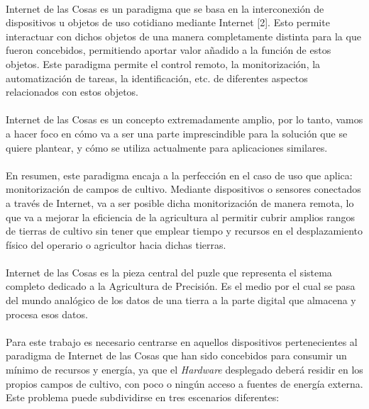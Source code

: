 \documentclass[../../memoria.tex]{subfiles}
\begin{document}
\paragraph{}
Internet de las Cosas es un paradigma que se basa en la interconexión de dispositivos u objetos de uso cotidiano mediante Internet [2]. Esto permite interactuar con dichos objetos de una manera completamente distinta para la que fueron concebidos, permitiendo aportar valor añadido a la función de estos objetos. Este paradigma permite el control remoto, la monitorización, la automatización de tareas, la identificación, etc. de diferentes aspectos relacionados con estos objetos.

\paragraph{}
Internet de las Cosas es un concepto extremadamente amplio, por lo tanto, vamos a hacer foco en cómo va a ser una parte imprescindible para la solución que se quiere plantear, y cómo se utiliza actualmente para aplicaciones similares.

\paragraph{}
En resumen, este paradigma encaja a la perfección en el caso de uso que aplica: monitorización de campos de cultivo. Mediante dispositivos o sensores conectados a través de Internet, va a ser posible dicha monitorización de manera remota, lo que va a mejorar la eficiencia de la agricultura al permitir cubrir amplios rangos de tierras de cultivo sin tener que emplear tiempo y recursos en el desplazamiento físico del operario o agricultor hacia dichas tierras.

\paragraph{}
Internet de las Cosas es la pieza central del puzle que representa el sistema completo dedicado a la Agricultura de Precisión. Es el medio por el cual se pasa del mundo analógico de los datos de una tierra a la parte digital que almacena y procesa esos datos.

\paragraph{}
Para este trabajo es necesario centrarse en aquellos dispositivos pertenecientes al paradigma de Internet de las Cosas que han sido concebidos para consumir un mínimo de recursos y energía, ya que el \textit{Hardware} desplegado deberá residir en los propios campos de cultivo, con poco o ningún acceso a fuentes de energía externa. Este problema puede subdividirse en tres escenarios diferentes:
\end{document}
